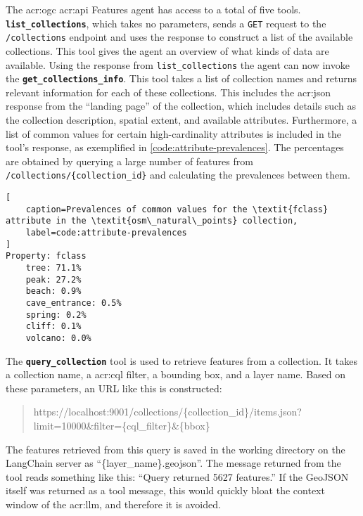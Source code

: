 The \acrshort{acr:ogc} \acrshort{acr:api} Features agent has access to a total of five tools. \textbf{\texttt{list\_collections}}, which takes no parameters, sends a \texttt{GET} request to the \texttt{/collections} endpoint and uses the response to construct a list of the available collections. This tool gives the agent an overview of what kinds of data are available. Using the response from \texttt{list\_collections} the agent can now invoke the \textbf{\texttt{get\_collections\_info}}. This tool takes a list of collection names and returns relevant information for each of these collections. This includes the \acrshort{acr:json} response from the \enquote{landing page} of the collection, which includes details such as the collection description, spatial extent, and available attributes. Furthermore, a list of common values for certain high-cardinality attributes is included in the tool's response, as exemplified in \autoref{code:attribute-prevalences}. The percentages are obtained by querying a large number of features from \texttt{/collections/\{collection\_id\}} and calculating the prevalences between them.

\begin{lstlisting}[
    caption=Prevalences of common values for the \textit{fclass} attribute in the \textit{osm\_natural\_points} collection,
    label=code:attribute-prevalences
]
Property: fclass
    tree: 71.1%
    peak: 27.2%
    beach: 0.9%
    cave_entrance: 0.5%
    spring: 0.2%
    cliff: 0.1%
    volcano: 0.0%
\end{lstlisting}

The \textbf{\texttt{query\_collection}} tool is used to retrieve features from a collection. It takes a collection name, a \acrshort{acr:cql} filter, a bounding box, and a layer name. Based on these parameters, an URL like this is constructed:

\begin{quote}
    https://localhost:9001/collections/\{collection\_id\}/items.json?limit=10000\&filter=\{cql\_filter\}\&\{bbox\}
\end{quote}

The features retrieved from this query is saved in the working directory on the LangChain server as \enquote{\{layer\_name\}.geojson}. The message returned from the tool reads something like this: \enquote{Query returned 5627 features.} If the GeoJSON itself was returned as a tool message, this would quickly bloat the context window of the \acrshort{acr:llm}, and therefore it is avoided.

